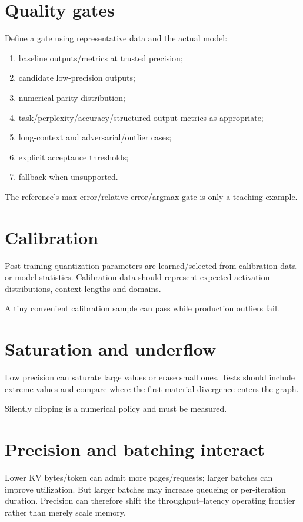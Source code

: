 \section{Quality gates}
Define a gate using representative data and the actual model:
\begin{enumerate}
\item baseline outputs/metrics at trusted precision;
\item candidate low-precision outputs;
\item numerical parity distribution;
\item task/perplexity/accuracy/structured-output metrics as appropriate;
\item long-context and adversarial/outlier cases;
\item explicit acceptance thresholds;
\item fallback when unsupported.
\end{enumerate}

The reference's max-error/relative-error/argmax gate is only a teaching example.

\section{Calibration}
Post-training quantization parameters are learned/selected from calibration data or model statistics. Calibration data should represent expected activation distributions, context lengths and domains.

A tiny convenient calibration sample can pass while production outliers fail.

\section{Saturation and underflow}
Low precision can saturate large values or erase small ones. Tests should include extreme values and compare where the first material divergence enters the graph.

Silently clipping is a numerical policy and must be measured.

\section{Precision and batching interact}
Lower KV bytes/token can admit more pages/requests; larger batches can improve utilization. But larger batches may increase queueing or per-iteration duration. Precision can therefore shift the throughput--latency operating frontier rather than merely scale memory.

